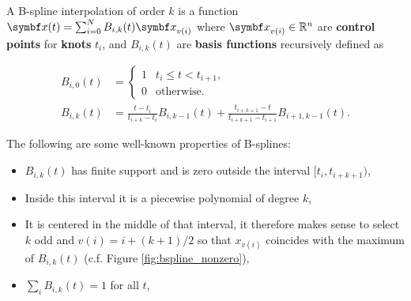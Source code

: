 A B-spline interpolation of order $k$ is a function $\x(t) = \sum_{i=0}^N B_{i, k}(t) \x_{v(i)}$ where $\x_{v(i)} \in \mathbb{R}^n$ are \textbf{control points} for \textbf{knots} $t_i$, and $B_{i, k}(t)$ are \textbf{basis functions} recursively defined as

\begin{equation}
  \label{eq:b_spline_rec}
  \begin{aligned}
    B_{i, 0}(t) & = \begin{cases}
      1 & t_i \leq t < t_{i+1}, \\
      0 & \text{otherwise}.
    \end{cases}                                                                               \\
    B_{i, k}(t) & = \frac{t - t_i}{t_{i+k} - t_i} B_{i, k-1}(t) + \frac{t_{i+k+1} - t}{t_{i+k+1} - t_{i+1}} B_{i+1, k-1}(t).
  \end{aligned}
\end{equation}

The following are some well-known properties of B-splines:
\begin{itemize}
  \item $B_{i, k}(t)$ has finite support and is zero outside the interval $[t_{i}, t_{i+k+1})$,
  \item Inside this interval it is a piecewise polynomial of degree $k$,
  \item It is centered in the middle of that interval, it therefore makes sense to select $k$ odd and $v(i) = i + (k + 1) / 2$ so that $x_{v(i)}$ coincides with the maximum of $B_{i, k}(t)$ (c.f. Figure \ref{fig:bspline_nonzero}),
  \item $\sum_i B_{i, k}(t) = 1$ for all $t$,
\end{itemize}

